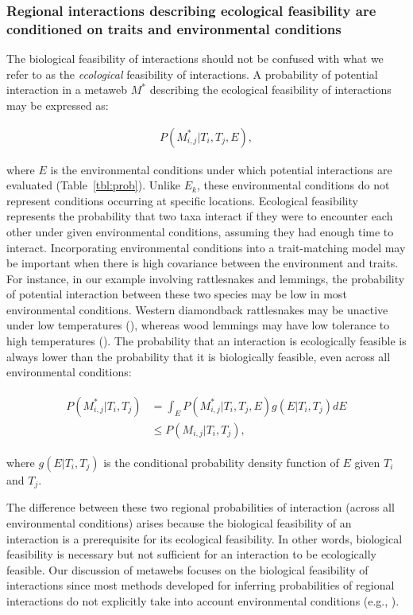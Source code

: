 \subsubsection{Regional interactions describing ecological feasibility are conditioned on traits and environmental conditions}

The biological feasibility of interactions should not be confused with what we
refer to as the \textit{ecological} feasibility of interactions. A probability
of potential interaction in a metaweb $M^*$ describing the ecological
feasibility of interactions may be expressed as: 

\begin{eqnarray}
  \label{eq:metaweb2}
  P(M^*_{i, j} | T_i, T_j, E),
\end{eqnarray}

where $E$ is the environmental conditions under which potential interactions are
evaluated (Table~\ref{tbl:prob}). Unlike $E_k$, these environmental conditions
do not represent conditions occurring at specific locations. Ecological
feasibility represents the probability that two taxa interact if they were to
encounter each other under given environmental conditions, assuming they had
enough time to interact. Incorporating environmental conditions into a
trait-matching model may be important when there is high covariance between the
environment and traits. For instance, in our example involving rattlesnakes and
lemmings, the probability of potential interaction between these two species may
be low in most environmental conditions. Western diamondback rattlesnakes may be
unactive under low temperatures (\cite{Kissner1997Rattling}), whereas wood
lemmings may have low tolerance to high temperatures
(\cite{Kausrud2008Linking}). The probability that an interaction is ecologically
feasible is always lower than the probability that it is biologically feasible,
even across all environmental conditions:

\begin{eqnarray}
\begin{split}
  \label{eq:feasibility}
  P(M^*_{i, j} | T_i, T_j) & = \int_{E}P(M^*_{i, j} | T_i, T_j, E) g(E|T_i, T_j) dE \\
  & \leq P(M_{i, j} |
T_i, T_j),
\end{split}
\end{eqnarray}

where $g(E | T_i, T_j)$ is the conditional probability density function of $E$
given $T_i$ and $T_j$. 

The difference between these two regional probabilities of interaction
(across all environmental conditions) arises because the biological
feasibility of an interaction is a prerequisite for its ecological feasibility.
In other words, biological feasibility is necessary but not sufficient for an
interaction to be ecologically feasible. Our discussion of metawebs focuses on
the biological feasibility of interactions since most methods developed for
inferring probabilities of regional interactions do not explicitly take into
account environmental conditions (e.g., \cite{Strydom2022Food}). 

